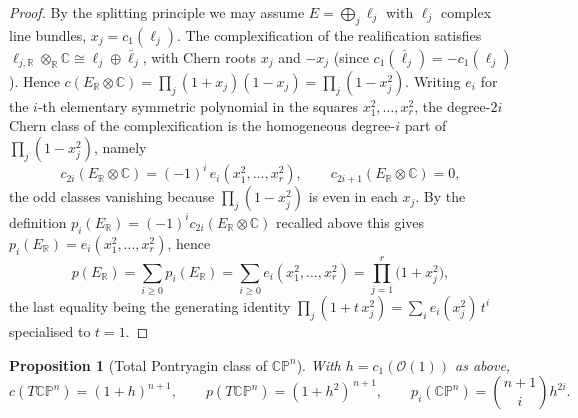 \documentclass[12pt]{article}
\newtheorem{proposition}{Proposition}
\theoremstyle{definition}
\begin{document}
\begin{proof}
By the splitting principle we may assume $E=\bigoplus_j \ell_j$ with $\ell_j$ complex line
bundles, $x_j=c_1(\ell_j)$.  The complexification of the realification satisfies
$\ell_{j,\mathbb{R}}\otimes_{\mathbb{R}}\mathbb{C}\cong \ell_j\oplus\bar\ell_j$, with Chern
roots $x_j$ and $-x_j$ (since $c_1(\bar\ell_j)=-c_1(\ell_j)$).  Hence
$c(E_{\mathbb{R}}\otimes\mathbb{C})=\prod_j(1+x_j)(1-x_j)=\prod_j(1-x_j^2)$.
Writing $e_i$ for the $i$-th elementary symmetric polynomial in the squares
$x_1^2,\dots,x_r^2$, the degree-$2i$ Chern class of the complexification is the
homogeneous degree-$i$ part of $\prod_j(1-x_j^2)$, namely
\[
c_{2i}(E_{\mathbb{R}}\otimes\mathbb{C})=(-1)^i\,e_i(x_1^2,\dots,x_r^2),
\qquad
c_{2i+1}(E_{\mathbb{R}}\otimes\mathbb{C})=0,
\]
the odd classes vanishing because $\prod_j(1-x_j^2)$ is even in each $x_j$.  By the
definition $p_i(E_{\mathbb{R}})=(-1)^i c_{2i}(E_{\mathbb{R}}\otimes\mathbb{C})$ recalled
above this gives $p_i(E_{\mathbb{R}})=e_i(x_1^2,\dots,x_r^2)$, hence
\[
p(E_{\mathbb{R}})=\sum_{i\ge0}p_i(E_{\mathbb{R}})=\sum_{i\ge0}e_i(x_1^2,\dots,x_r^2)
=\prod_{j=1}^r\big(1+x_j^2\big),
\]
the last equality being the generating identity
$\prod_j(1+t\,x_j^2)=\sum_i e_i(x_j^2)\,t^i$ specialised to $t=1$.
\end{proof}

\begin{proposition}[Total Pontryagin class of $\mathbb{CP}^n$]\label{prop:cppont}
With $h=c_1(\mathcal{O}(1))$ as above,
\[
c(T\mathbb{CP}^n)=(1+h)^{n+1},
\qquad
p(T\mathbb{CP}^n)=(1+h^2)^{\,n+1},
\qquad
p_i(\mathbb{CP}^n)=\binom{n+1}{i}h^{2i}.
\]
\end{proposition}
\end{document}
